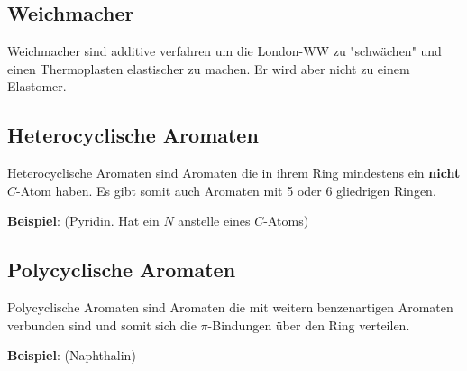 \subsection{Weichmacher}
Weichmacher sind additive verfahren um die London-WW zu "schwächen" und einen Thermoplasten elastischer zu machen. Er wird aber nicht zu einem Elastomer.


\subsection{Heterocyclische Aromaten} 
\label{sec:heteroaromaten}
Heterocyclische Aromaten sind Aromaten die in ihrem Ring mindestens ein \textbf{nicht} $C$-Atom haben. 
Es gibt somit auch Aromaten mit 5 oder 6 gliedrigen Ringen.

\textbf{Beispiel}: (Pyridin. Hat ein $N$ anstelle eines $C$-Atoms) 



\subsection{Polycyclische Aromaten} 
\label{sec:polyaromaten}
Polycyclische Aromaten sind Aromaten die mit weitern benzenartigen Aromaten verbunden sind und somit sich die $\pi$-Bindungen über den Ring verteilen.

\textbf{Beispiel}: (Naphthalin)


